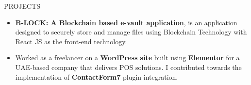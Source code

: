 \documentclass{resume} %
\begin{document}
\begin{rSection}{PROJECTS}
    \begin{itemize}

        \item \textbf{B-LOCK: A Blockchain based e-vault application}{, is
                  an application designed to securely store and manage
                  files using Blockchain Technology with React JS as the front-end technology.
              }

              \item Worked as a freelancer on a \textbf{WordPress site} built using \textbf{Elementor} for a UAE-based company that delivers POS solutions. I contributed towards the implementation of \textbf{ContactForm7} plugin integration.





    \end{itemize}

\end{rSection}
\end{document}
